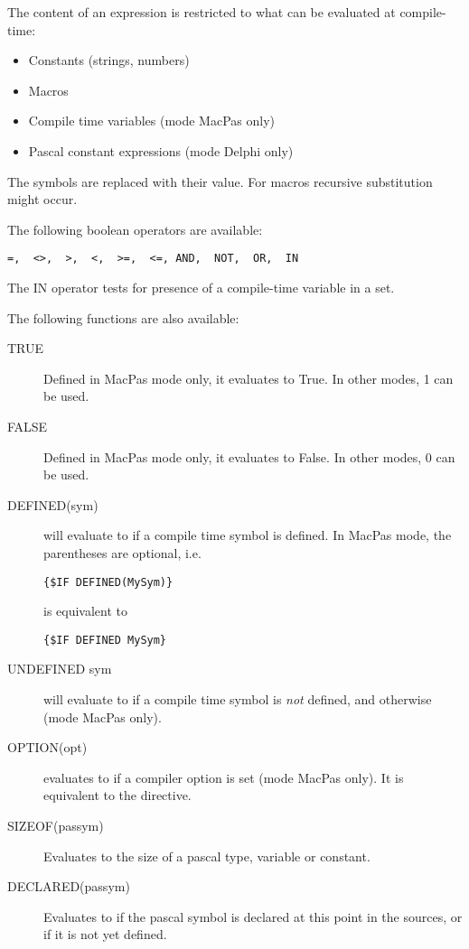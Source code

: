 The content of an expression is restricted to what can be evaluated at
compile-time:
\begin{itemize}
\item Constants (strings, numbers)
\item Macros
\item Compile time variables (mode MacPas only)
\item Pascal constant expressions (mode Delphi only)
\end{itemize}
The symbols are replaced with their value. For macros recursive substitution
might occur.

The following boolean operators are available:
\begin{verbatim}
=,  <>,  >,  <,  >=,  <=, AND,  NOT,  OR,  IN 
\end{verbatim}
The IN operator tests for presence of a compile-time variable in a set.

The following functions are also available:
\begin{description}
\item[TRUE] Defined in MacPas mode only, it evaluates to True. In other
modes, 1 can be used.
\item[FALSE] Defined in MacPas mode only, it evaluates to False. In other
modes, 0 can be used.
\item[DEFINED(sym)] will evaluate to  if a compile time symbol is
defined. In MacPas mode, the parentheses are optional, i.e. 
\begin{verbatim}
{$IF DEFINED(MySym)}
\end{verbatim}
is equivalent to 
\begin{verbatim}
{$IF DEFINED MySym}
\end{verbatim}
\item[UNDEFINED sym] will evaluate to  if a compile time symbol is {\em
not} defined, and  otherwise (mode MacPas only).
\item[OPTION(opt)] evaluates to  if a compiler option is set (mode MacPas
only). It is equivalent to the  directive.
\item[SIZEOF(passym)] Evaluates to the size of a pascal type, variable or
constant.
\item[DECLARED(passym)] Evaluates to  if the pascal symbol is
declared at this point in the sources, or  if it is not yet
defined.
\end{description}

